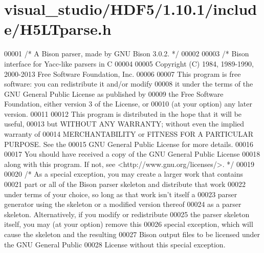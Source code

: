\hypertarget{visual__studio_2_h_d_f5_21_810_81_2include_2_h5_l_tparse_8h_source}{}\section{visual\+\_\+studio/\+H\+D\+F5/1.10.1/include/\+H5\+L\+Tparse.h}
\label{visual__studio_2_h_d_f5_21_810_81_2include_2_h5_l_tparse_8h_source}

\begin{DoxyCode}
00001 \textcolor{comment}{/* A Bison parser, made by GNU Bison 3.0.2.  */}
00002 
00003 \textcolor{comment}{/* Bison interface for Yacc-like parsers in C}
00004 \textcolor{comment}{}
00005 \textcolor{comment}{   Copyright (C) 1984, 1989-1990, 2000-2013 Free Software Foundation, Inc.}
00006 \textcolor{comment}{}
00007 \textcolor{comment}{   This program is free software: you can redistribute it and/or modify}
00008 \textcolor{comment}{   it under the terms of the GNU General Public License as published by}
00009 \textcolor{comment}{   the Free Software Foundation, either version 3 of the License, or}
00010 \textcolor{comment}{   (at your option) any later version.}
00011 \textcolor{comment}{}
00012 \textcolor{comment}{   This program is distributed in the hope that it will be useful,}
00013 \textcolor{comment}{   but WITHOUT ANY WARRANTY; without even the implied warranty of}
00014 \textcolor{comment}{   MERCHANTABILITY or FITNESS FOR A PARTICULAR PURPOSE.  See the}
00015 \textcolor{comment}{   GNU General Public License for more details.}
00016 \textcolor{comment}{}
00017 \textcolor{comment}{   You should have received a copy of the GNU General Public License}
00018 \textcolor{comment}{   along with this program.  If not, see <http://www.gnu.org/licenses/>.  */}
00019 
00020 \textcolor{comment}{/* As a special exception, you may create a larger work that contains}
00021 \textcolor{comment}{   part or all of the Bison parser skeleton and distribute that work}
00022 \textcolor{comment}{   under terms of your choice, so long as that work isn't itself a}
00023 \textcolor{comment}{   parser generator using the skeleton or a modified version thereof}
00024 \textcolor{comment}{   as a parser skeleton.  Alternatively, if you modify or redistribute}
00025 \textcolor{comment}{   the parser skeleton itself, you may (at your option) remove this}
00026 \textcolor{comment}{   special exception, which will cause the skeleton and the resulting}
00027 \textcolor{comment}{   Bison output files to be licensed under the GNU General Public}
00028 \textcolor{comment}{   License without this special exception.}

\end{DoxyCode}
